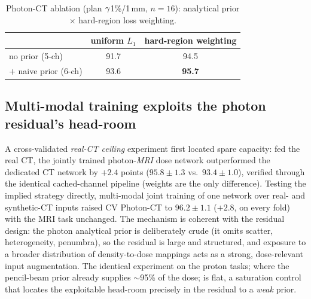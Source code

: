 \documentclass{llncs}
\begin{document}
\begin{table}[h]\centering
\caption{Photon-CT ablation (plan $\gamma$1\%/1\,mm, $n=16$): analytical prior $\times$
hard-region loss weighting.}\label{tab:abl}
\begin{tabular}{@{}lcc@{}}\toprule
 & uniform $L_1$ & hard-region weighting\\\midrule
no prior (5-ch) & 91.7 & 94.5\\
$+$ naive prior (6-ch) & 93.6 & \textbf{95.7}\\\bottomrule
\end{tabular}\end{table}

\subsection{Multi-modal training exploits the photon residual's head-room}
A cross-validated \emph{real-CT ceiling} experiment first located spare capacity: fed the real
CT, the jointly trained photon-\emph{MRI} dose network outperformed the dedicated CT network by
$+2.4$ points ($95.8\pm1.3$ vs.\ $93.4\pm1.0$), verified through the identical cached-channel
pipeline (weights are the only difference). Testing the implied strategy directly, multi-modal
joint training of one network over real- and synthetic-CT inputs raised CV Photon-CT to
$96.2\pm1.1$ ($+2.8$, on every fold) with the MRI task unchanged. The mechanism is coherent with
the residual design: the photon analytical prior is deliberately crude (it omits scatter,
heterogeneity, penumbra), so the residual is large and structured, and exposure to a broader
distribution of density-to-dose mappings acts as a strong, dose-relevant input augmentation. The
identical experiment on the proton tasks; where the pencil-beam prior already supplies
$\sim$95\% of the dose; is flat, a saturation control that locates the exploitable head-room
precisely in the residual to a \emph{weak} prior.
\end{document}
